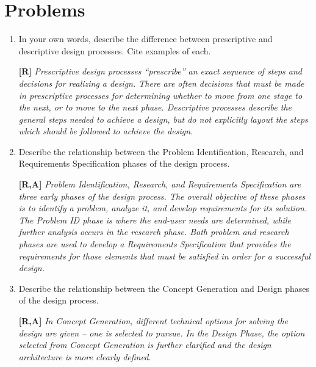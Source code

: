 \section{Problems}
\label{section:engrDesignProcessProblems}

\begin{enumerate}
\itemsep0em 
\def\labelenumi{\arabic{enumi}.}
\item
  In your own words, describe the difference between prescriptive and
  descriptive design processes. Cite examples of each.
  
\begin{onlysolution}
\textbf{[R]}
\itshape
Prescriptive design processes “prescribe” an exact sequence of steps and decisions for
realizing a design. There are often decisions that must be made in prescriptive processes for
determining whether to move from one stage to the next, or to move to the next phase.
Descriptive processes describe the general steps needed to achieve a design, but do not
explicitly layout the steps which should be followed to achieve the design.
\end{onlysolution}


  
\item
Describe the relationship between the Problem Identification,
Research, and Requirements Specification phases of the design process.

\begin{onlysolution}
\textbf{[R,A]}
\itshape
Problem Identification, Research, and Requirements Specification are three early phases of
the design process. The overall objective of these phases is to identify a problem, analyze it,
and develop requirements for its solution. The Problem ID phase is where the end-user needs
are determined, while further analysis occurs in the research phase. Both problem and
research phases are used to develop a Requirements Specification that provides the
requirements for those elements that must be satisfied in order for a successful design.
\end{onlysolution}

\item
  Describe the relationship between the Concept Generation and Design
  phases of the design process.
  
\begin{onlysolution}
\textbf{[R,A]}
\itshape
  In Concept Generation, different technical options for solving the design are given – one is
selected to pursue. In the Design Phase, the option selected from Concept Generation is
further clarified and the design architecture is more clearly defined.
\end{onlysolution}
  

\end{enumerate}
